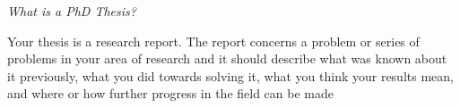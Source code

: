 \textit{What is a PhD Thesis?} 

Your thesis is a research report. The report concerns a problem or series of problems in your area of research and it should describe what was known about it previously, what you did towards solving it, what you think your results mean, and where or how further progress in the field can be made
